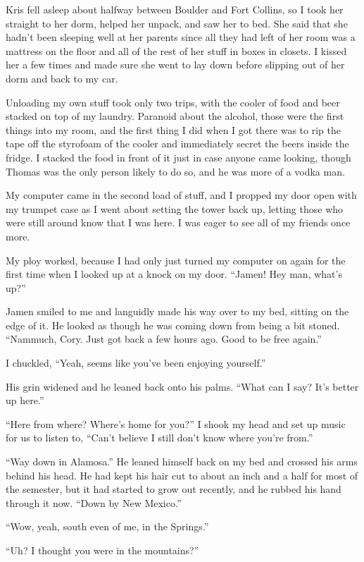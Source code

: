 Kris fell asleep about halfway between Boulder and Fort Collins, so I took her straight to her dorm, helped her unpack, and saw her to bed.  She said that she hadn't been sleeping well at her parents since all they had left of her room was a mattress on the floor and all of the rest of her stuff in boxes in closets.  I kissed her a few times and made sure she went to lay down before slipping out of her dorm and back to my car.

Unloading my own stuff took only two trips, with the cooler of food and beer stacked on top of my laundry.  Paranoid about the alcohol, those were the first things into my room, and the first thing I did when I got there was to rip the tape off the styrofoam of the cooler and immediately secret the beers inside the fridge.  I stacked the food in front of it just in case anyone came looking, though Thomas was the only person likely to do so, and he was more of a vodka man.

My computer came in the second load of stuff, and I propped my door open with my trumpet case as I went about setting the tower back up, letting those who were still around know that I was here.  I was eager to see all of my friends once more.

My ploy worked, because I had only just turned my computer on again for the first time when I looked up at a knock on my door.  ``Jamen!  Hey man, what's up?''

Jamen smiled to me and languidly made his way over to my bed, sitting on the edge of it.  He looked as though he was coming down from being a bit stoned.  ``Nammuch, Cory.  Just got back a few hours ago.  Good to be free again.''

I chuckled, ``Yeah, seems like you've been enjoying yourself.''

His grin widened and he leaned back onto his palms.  ``What can I say?  It's better up here.''

``Here from where?  Where's home for you?''  I shook my head and set up music for us to listen to, ``Can't believe I still don't know where you're from.''

``Way down in Alamosa.''  He leaned himself back on my bed and crossed his arms behind his head.  He had kept his hair cut to about an inch and a half for most of the semester, but it had started to grow out recently, and he rubbed his hand through it now.  ``Down by New Mexico.''

``Wow, yeah, south even of me, in the Springs.''

``Uh?  I thought you were in the mountains?''

